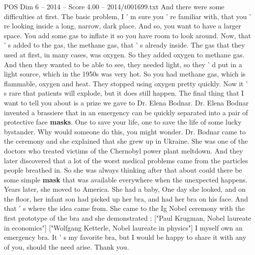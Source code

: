 \begin{textsample}{POS Dim 6 – 2014 – Score 4.00 – 2014/t001699.txt}
And there were some difficulties at first.
The basic problem, I ' m sure you ' re familiar with, that you ' re looking inside a long, narrow, dark place.
And so, you want to have a larger space.
You add some gas to inflate it so you have room to look around.
Now, that ' s added to the gas, the methane gas, that ' s already inside.
The gas that they used at first, in many cases, was oxygen.
So they added oxygen to methane gas.
And then they wanted to be able to see, they needed light, so they ' d put in a light source, which in the 1950s was very hot.
So you had methane gas, which is flammable, oxygen and heat.
They stopped using oxygen pretty quickly.
Now it ' s rare that patients will explode, but it does still happen.
The final thing that I want to tell you about is a prize we gave to Dr.
Elena Bodnar.
Dr.
Elena Bodnar invented a brassiere that in an emergency can be quickly separated into a pair of protective face \textbf{masks}.
One to save your life, one to save the life of some lucky bystander.
Why would someone do this, you might wonder.
Dr.
Bodnar came to the ceremony and she explained that she grew up in Ukraine.
She was one of the doctors who treated victims of the Chernobyl power plant meltdown.
And they later discovered that a lot of the worst medical problems came from the particles people breathed in.
So she was always thinking after that about could there be some simple \textbf{mask} that was available everywhere when the unexpected happens.
Years later, she moved to America.
She had a baby, One day she looked, and on the floor, her infant son had picked up her bra, and had her bra on his face.
And that ' s where the idea came from.
She came to the Ig Nobel ceremony with the first prototype of the bra and she demonstrated : ["Paul Krugman, Nobel laureate in economics"] ["Wolfgang Ketterle, Nobel laureate in physics"] I myself own an emergency bra.
It ' s my favorite bra, but I would be happy to share it with any of you, should the need arise.
Thank you.

\end{textsample}
